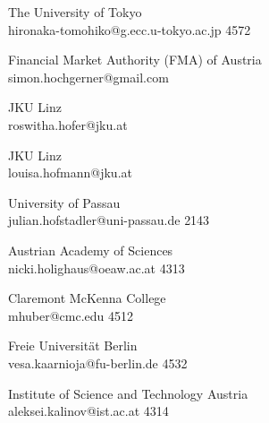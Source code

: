 \begin{multicols}{2}
 {The University of Tokyo\\}%
 {hironaka-tomohiko@g.ecc.u-tokyo.ac.jp}%
 {4572} %
 {} %
 {} %
 {} %
 {} %

 {Financial Market Authority (FMA) of Austria\\}%
 {simon.hochgerner@gmail.com}%
 {} %
 {} %
 {} %
 {} %
 {} %

 {JKU Linz\\}%
 {roswitha.hofer@jku.at}%
 {} %
 {} %
 {} %
 {} %
 {} %

 {JKU Linz\\}%
 {louisa.hofmann@jku.at}%
 {} %
 {} %
 {} %
 {} %
 {} %

 {University of Passau\\}%
 {julian.hofstadler@uni-passau.de}%
 {2143} %
 {} %
 {} %
 {} %
 {} %

 {Austrian Academy of Sciences\\}%
 {nicki.holighaus@oeaw.ac.at}%
 {4313} %
 {} %
 {} %
 {} %
 {} %

 {Claremont McKenna College\\}%
 {mhuber@cmc.edu}%
 {4512} %
 {} %
 {} %
 {} %
 {} %

 {Freie Universit\"at Berlin\\}%
 {vesa.kaarnioja@fu-berlin.de}%
 {4532} %
 {} %
 {} %
 {} %
 {} %

 {Institute of Science and Technology Austria\\}%
 {aleksei.kalinov@ist.ac.at}%
 {4314} %
 {} %
 {} %
 {} %
 {} %


\end{multicols}
